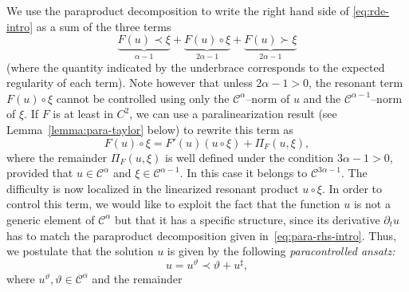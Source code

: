 \documentclass[11pt,a4paper]{article}
\newcommand{\tmtextit}[1]{{\itshape{#1}}}
\theoremstyle{remark}
\newcommand{\CC}{\ensuremath{\mathscr{C}}}
\begin{document}
We use the paraproduct decomposition to write the right hand side of {\eqref{eq:rde-intro}} as a
sum of the three terms
\begin{equation}\label{eq:para-rhs-intro}
  \underbrace{F ( u ) \prec \xi}_{\alpha -1} + \underbrace{F ( u ) \circ  \xi}_{2 \alpha -1} + \underbrace{F ( u ) \succ \xi}_{2 \alpha -1}
\end{equation}
(where the quantity indicated by the underbrace corresponds to the expected regularity of each term). Note however that unless $2 \alpha -1>0$, the resonant term
$F ( u ) \circ   \xi$ cannot be controlled using only the $\CC^{\alpha}$--norm
of $u$ and the $\CC^{\alpha -1}$--norm of $\xi$. If $F$ is at least in $C^2$, we can use a paralinearization result (see Lemma~\ref{lemma:para-taylor} below) to rewrite this term as
\begin{equation}\label{eq:rde expand Fu}
   F ( u ) \circ \xi =F' ( u )  ( u \circ \xi ) + \Pi_{F} ( u, \xi ),
\end{equation}
where the remainder $\Pi_{F} ( u, \xi )$ is well defined under the condition
$3 \alpha -1>0$, provided that $u \in \CC^{\alpha}$ and $\xi \in \CC^{\alpha -1}$. In this case it belongs to $\CC^{3 \alpha -1}$. The
difficulty is now localized in the linearized resonant product $u \circ \xi$. In order to control this term, we would like to exploit the fact that
the function $u$ is not a generic element of $\CC^{\alpha}$ but that it has a
specific structure, since its derivative $\partial_{t} u$ has to match the
paraproduct decomposition given in~\eqref{eq:para-rhs-intro}. Thus, we postulate
that the solution $u$ is given by the following \tmtextit{paracontrolled ansatz:}
\[
   u=u^{\vartheta} \prec \vartheta +u^{\sharp},
\]
where $u^{\vartheta} , \vartheta \in \CC^{\alpha}$ and the remainder
\end{document}
